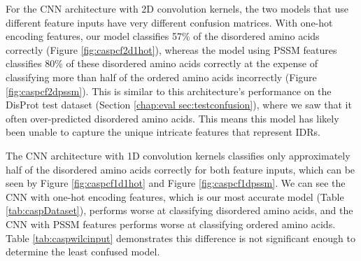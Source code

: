 \documentclass{l4proj}
\begin{document}
For the CNN architecture with 2D convolution kernels, the two models that use different feature inputs have very different confusion matrices. With one-hot encoding features, our model classifies 57\% of the disordered amino acids correctly (Figure \ref{fig:caspcf2d1hot}), whereas the model using PSSM features classifies 80\% of these disordered amino acids correctly at the expense of classifying more than half of the ordered amino acids incorrectly (Figure \ref{fig:caspcf2dpssm}). This is similar to this architecture’s performance on the DisProt test dataset (Section \ref{chap:eval sec:testconfusion}), where we saw that it often over-predicted disordered amino acids. This means this model has likely been unable to capture the unique intricate features that represent IDRs.

The CNN architecture with 1D convolution kernels classifies only approximately half of the disordered amino acids correctly for both feature inputs, which can be seen by Figure \ref{fig:caspcf1d1hot} and Figure \ref{fig:caspcf1dpssm}. We can see the CNN with one-hot encoding features, which is our most accurate model (Table \ref{tab:caspDataset}), performs worse at classifying disordered amino acids, and the CNN with PSSM features performs worse at classifying ordered amino acids. Table \ref{tab:caspwilcinput} demonstrates this difference is not significant enough to determine the least confused model. \\
\end{document}
